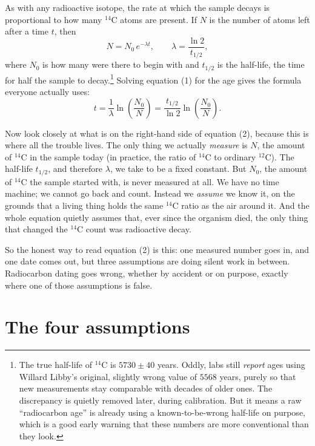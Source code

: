 \documentclass[11pt]{article}
\begin{document}
As with any radioactive isotope, the rate at which the sample decays is proportional to how many $^{14}\mathrm{C}$ atoms are present. If $N$ is the number of atoms left after a time $t$, then
\begin{equation}
N = N_0\,e^{-\lambda t},
\qquad
\lambda = \frac{\ln 2}{t_{1/2}},
\end{equation}
where $N_0$ is how many were there to begin with and $t_{1/2}$ is the half-life, the time for half the sample to decay.\footnote{The true half-life of $^{14}\mathrm{C}$ is $5730 \pm 40$ years. Oddly, labs still \emph{report} ages using Willard Libby's original, slightly wrong value of $5568$ years, purely so that new measurements stay comparable with decades of older ones. The discrepancy is quietly removed later, during calibration. But it means a raw ``radiocarbon age'' is already using a known-to-be-wrong half-life on purpose, which is a good early warning that these numbers are more conventional than they look.} Solving equation (1) for the age gives the formula everyone actually uses:
\begin{equation}
t = \frac{1}{\lambda}\ln\!\left(\frac{N_0}{N}\right)
  = \frac{t_{1/2}}{\ln 2}\ln\!\left(\frac{N_0}{N}\right).
\end{equation}

Now look closely at what is on the right-hand side of equation (2), because this is where all the trouble lives. The only thing we actually \emph{measure} is $N$, the amount of $^{14}\mathrm{C}$ in the sample today (in practice, the ratio of $^{14}\mathrm{C}$ to ordinary $^{12}\mathrm{C}$). The half-life $t_{1/2}$, and therefore $\lambda$, we take to be a fixed constant. But $N_0$, the amount of $^{14}\mathrm{C}$ the sample started with, is never measured at all. We have no time machine; we cannot go back and count. Instead we \emph{assume} we know it, on the grounds that a living thing holds the same $^{14}\mathrm{C}$ ratio as the air around it. And the whole equation quietly assumes that, ever since the organism died, the only thing that changed the $^{14}\mathrm{C}$ count was radioactive decay.

So the honest way to read equation (2) is this: one measured number goes in, and one date comes out, but three assumptions are doing silent work in between. Radiocarbon dating goes wrong, whether by accident or on purpose, exactly where one of those assumptions is false.

\section*{The four assumptions}
\end{document}
